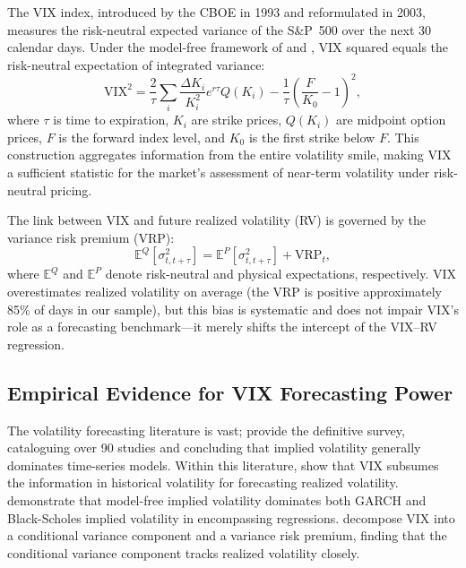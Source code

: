 \documentclass[12pt,a4paper]{article}
\begin{document}
The VIX index, introduced by the CBOE in 1993 and reformulated in 2003, measures the risk-neutral expected variance of the S\&P~500 over the next 30 calendar days. Under the model-free framework of \citet{britten2000} and \citet{jiang2005}, VIX squared equals the risk-neutral expectation of integrated variance:
\begin{equation}
\text{VIX}^2 = \frac{2}{\tau} \sum_i \frac{\Delta K_i}{K_i^2} e^{r\tau} Q(K_i) - \frac{1}{\tau}\left(\frac{F}{K_0}-1\right)^2,
\label{eq:vix}
\end{equation}
where $\tau$ is time to expiration, $K_i$ are strike prices, $Q(K_i)$ are midpoint option prices, $F$ is the forward index level, and $K_0$ is the first strike below $F$. This construction aggregates information from the entire volatility smile, making VIX a sufficient statistic for the market's assessment of near-term volatility under risk-neutral pricing.

The link between VIX and future realized volatility (RV) is governed by the variance risk premium (VRP):
\begin{equation}
\mathbb{E}^Q[\sigma^2_{t,t+\tau}] = \mathbb{E}^P[\sigma^2_{t,t+\tau}] + \text{VRP}_t,
\label{eq:vrp}
\end{equation}
where $\mathbb{E}^Q$ and $\mathbb{E}^P$ denote risk-neutral and physical expectations, respectively. VIX overestimates realized volatility on average (the VRP is positive approximately 85\% of days in our sample), but this bias is systematic and does not impair VIX's role as a forecasting benchmark---it merely shifts the intercept of the VIX--RV regression.

\subsection{Empirical Evidence for VIX Forecasting Power}

The volatility forecasting literature is vast; \citet{poon2003} provide the definitive survey, cataloguing over 90 studies and concluding that implied volatility generally dominates time-series models. Within this literature, \citet{christensen1998} show that VIX subsumes the information in historical volatility for forecasting realized volatility. \citet{jiang2005} demonstrate that model-free implied volatility dominates both GARCH and Black-Scholes implied volatility in encompassing regressions. \citet{bekaert2014} decompose VIX into a conditional variance component and a variance risk premium, finding that the conditional variance component tracks realized volatility closely.
\end{document}
